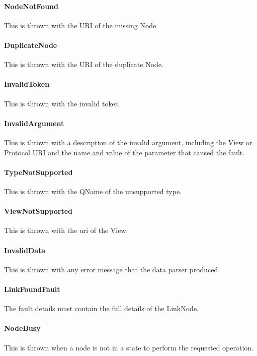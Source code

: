 \documentclass[11pt,a4paper]{ivoa}
\begin{document}
\paragraph{NodeNotFound}
This is thrown with the URI of the missing Node.

\paragraph{DuplicateNode}
This is thrown with the URI of the duplicate Node.

\paragraph{InvalidToken}
This is thrown with the invalid token.

\paragraph{InvalidArgument}
This is thrown with a description of the invalid argument, including the View or Protocol URI and the name and value of the parameter that caused the fault.

\paragraph{TypeNotSupported}
This is thrown with the QName of the unsupported type.

\paragraph{ViewNotSupported}
This is thrown with the uri of the View.

\paragraph{InvalidData}
This is thrown with any error message that the data parser produced.

\paragraph{LinkFoundFault}
The fault details must contain the full details of the LinkNode.

\paragraph{NodeBusy}
This is thrown when a node is not in a state to perform the requested operation.
\end{document}

